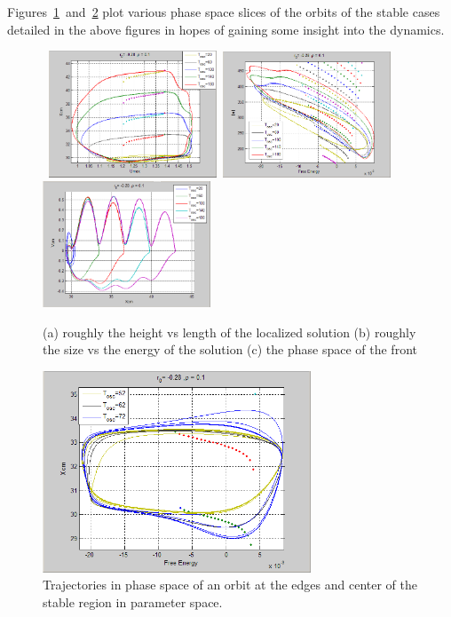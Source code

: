\documentclass[pre,preprint,superscriptaddress]{revtex4-1}
\begin{document}
Figures~\ref{fig:PhaseSlice}~and~\ref{fig:PhaseSlice2}  plot various phase space slices of the orbits of the stable cases detailed in the above figures in hopes of gaining some insight into the dynamics.
\begin{figure}[!htb]
\begin{center}
    \mbox{
\includegraphics[width=50mm]{XumaxStable.png}
\includegraphics[width=50mm]{FEnormStable.png}
\includegraphics[width=50mm]{FrontPhase.png}
}
\caption{(a) roughly the height vs length of the localized solution (b) roughly the size vs the energy of the solution (c) the phase space of the front  }
    \label{fig:PhaseSlice}
\end{center}
\end{figure}


\begin{figure}[!htb]\center

\includegraphics[width=80mm]{XcmFEstablerange.png}

\caption{Trajectories in phase space of  an orbit at the edges and center of the stable region in parameter space.}
    \label{fig:PhaseSlice2}
\end{figure}
\end{document}
